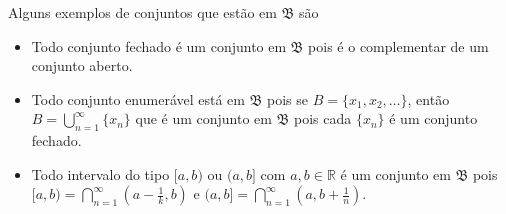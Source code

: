\documentclass[a4paper, 11pt]{book}
\theoremstyle{definition}
\newcommand{\bN}{\mathbb{N}}
\newcommand{\bR}{\mathbb{R}}
\newcommand{\cB}{\mathfrak{B}}
\begin{document}
\begin{prf}




\end{prf}

\begin{ex}
    Alguns exemplos de conjuntos que estão em $\cB$ são
    \begin{itemize}
        \item Todo conjunto fechado é um conjunto em $\cB$ pois é o complementar de um conjunto aberto.
        \item Todo conjunto enumerável está em $\cB$ pois se $B = \{x_1,x_2,\dots\}$, então $B = \bigcup_{n=1}^\infty \{x_n\}$ que é um conjunto em $\cB$ pois cada $\{x_n\}$ é um conjunto fechado.
        \item Todo intervalo do tipo $[a,b)$ ou $(a,b]$ com $a,b \in \bR$ é um conjunto em $\cB$ pois $[a,b) = \bigcap_{n=1}^\infty (a- \frac{1}{k}, b)$ e $(a,b] = \bigcap_{n=1}^\infty (a, b + \frac{1}{n})$.
    \end{itemize}
\end{ex}
\end{document}
